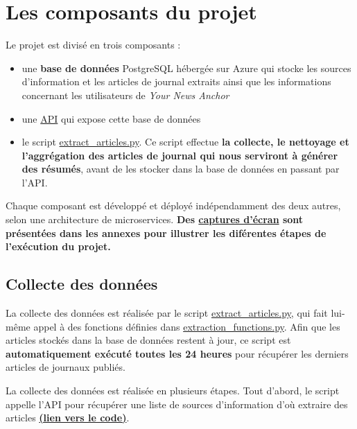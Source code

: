\documentclass[french]{article}
\begin{document}
    \section{Les composants du projet}
    Le projet est divisé en trois composants : 
    \begin{itemize}
        \item une \textbf{base de données} PostgreSQL hébergée sur Azure qui stocke les sources d'information et les articles de journal extraits ainsi que les informations concernant les utilisateurs de \textit{Your News Anchor}
        \item une \href{https://github.com/vinpap/your_news_anchor_db_api}{API} qui expose cette base de données
        \item le script \href{https://github.com/vinpap/your_news_anchor/blob/main/extract_articles.py}{extract\_articles.py}. Ce script effectue \textbf{la collecte, le nettoyage et l'aggrégation des articles de journal qui nous serviront à générer des résumés}, avant de les stocker dans la base de données en passant par l'API.
    \end{itemize}
    Chaque composant est développé et déployé indépendamment des deux autres, selon une architecture de microservices. \textbf{Des \textbf{\hyperref[img:screenshots_processus]{captures d'écran}} sont présentées dans les annexes pour illustrer les diférentes étapes de l'exécution du projet.}
    
    \subsection{Collecte des données}

    La collecte des données est réalisée par le script \href{https://github.com/vinpap/your_news_anchor/blob/main/extract_articles.py}{extract\_articles.py}, qui fait lui-même appel à des fonctions définies dans \href{https://github.com/vinpap/your_news_anchor/blob/5deffe3be7453d998b2377548902759869e1926d/extraction_functions.py}{extraction\_functions.py}. Afin que les articles stockés dans la base de données restent à jour, ce script est \textbf{automatiquement exécuté toutes les 24 heures} pour récupérer les derniers articles de journaux publiés.
    
    La collecte des données est réalisée en plusieurs étapes. Tout d'abord, le script appelle l'API pour récupérer une liste de sources d'information d'où extraire des articles \href{https://github.com/vinpap/your_news_anchor/blob/5deffe3be7453d998b2377548902759869e1926d/extract_articles.py#L37}{\textbf{(lien vers le code)}}.
\end{document}
